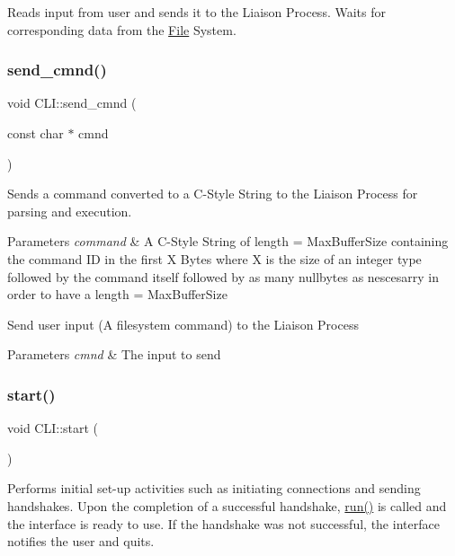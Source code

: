 Reads input from user and sends it to the Liaison Process. Waits for corresponding data from the \mbox{\hyperlink{classFile}{File}} System. \mbox{\label{classCLI_a1d25fcb18cf42e03a7e38c24a8ba1506}} 
\subsubsection{\texorpdfstring{send\+\_\+cmnd()}{send\_cmnd()}}
{\footnotesize\ttfamily void C\+L\+I\+::send\+\_\+cmnd (\begin{DoxyParamCaption}\item[{const char $\ast$}]{cmnd }\end{DoxyParamCaption})}

Sends a command converted to a C-\/\+Style String to the Liaison Process for parsing and execution.


\begin{DoxyParams}{Parameters}
{\em command} & A C-\/\+Style String of length = Max\+Buffer\+Size containing the command ID in the first X Bytes where X is the size of an integer type followed by the command itself followed by as many nullbytes as nescesarry in order to have a length = Max\+Buffer\+Size\\
\hline
\end{DoxyParams}
Send user input (A filesystem command) to the Liaison Process 
\begin{DoxyParams}{Parameters}
{\em cmnd} & The input to send \\
\hline
\end{DoxyParams}
\mbox{\label{classCLI_a1492005f186392031bd4d447cb20e975}} 
\subsubsection{\texorpdfstring{start()}{start()}}
{\footnotesize\ttfamily void C\+L\+I\+::start (\begin{DoxyParamCaption}{ }\end{DoxyParamCaption})}

Performs initial set-\/up activities such as initiating connections and sending handshakes. Upon the completion of a successful handshake, \mbox{\hyperlink{classCLI_aeefc8cd81999836a90c2cfaced6177f1}{run()}} is called and the interface is ready to use. If the handshake was not successful, the interface notifies the user and quits.

